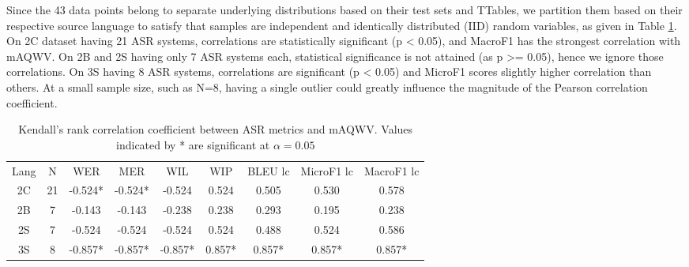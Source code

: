 Since the 43 data points belong to separate underlying distributions based on their test sets and TTables, we partition them based on their respective source language to satisfy that samples are independent and identically distributed (IID) random variables, as given in Table \ref{tab:asr-aqwv-kendall}.
On 2C dataset having 21 ASR systems, correlations are statistically significant (p < 0.05), and MacroF1 has the strongest correlation with mAQWV. On 2B and 2S having only 7 ASR systems each, statistical significance is not attained (as p >= 0.05), hence we ignore those correlations.
On 3S having 8 ASR systems, correlations are significant (p < 0.05) and MicroF1 scores slightly higher correlation than others.
At a small sample size, such as N=8, having a single outlier could greatly influence the magnitude of the Pearson correlation coefficient. 


\begin{table}[h!t]
    \footnotesize
    \centering
    \begin{tabular}{ccccccccc}
Lang & N & WER & MER & WIL & WIP & BLEU lc & MicroF1 lc & MacroF1 lc \\
2C & 21 & -0.524* & -0.524*  & -0.524  & 0.524 & 0.505 & 0.530  & 0.578 \\
2B & 7  & -0.143  & -0.143  & -0.238 & 0.238 & 0.293 & 0.195 & 0.238  \\
2S & 7  & -0.524  & -0.524  & -0.524 & 0.524 & 0.488 & 0.524 & 0.586  \\
3S & 8  & -0.857*  & -0.857* & -0.857* & 0.857* & 0.857* & 0.857* & 0.857* \\
\end{tabular} 
    \caption{Kendall’s rank correlation coefficient  between ASR metrics and mAQWV. Values indicated by * are significant at $\alpha=0.05$ }
    \label{tab:asr-aqwv-kendall}
\end{table}



